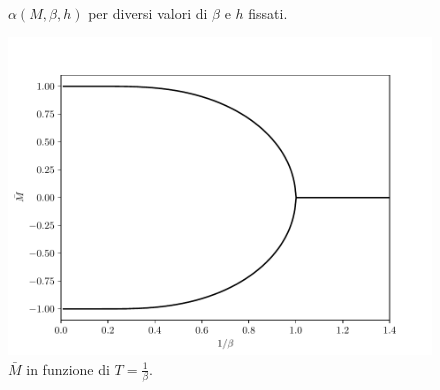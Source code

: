 \iffigureon
\begin{figure}[p]
    \centering
    \subfloat{}
    \subfloat{} \\
    \subfloat{}
    \subfloat{}
    \caption{$ \alpha(M,\beta,h) $ per diversi valori di $ \beta $ e $ h $ fissati.}
    \label{fig:alpha}
\end{figure}
\begin{figure}[p]
    \centering
    \includegraphics[scale=0.8]{img/cw/transizione.pdf}
    \caption{$ \bar{M} $ in funzione di $ T = \frac{1}{\beta}$.}
    \label{fig:transizione}
\end{figure}
\fi

